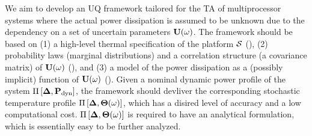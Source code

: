 We aim to develop an UQ framework tailored for the TA of multiprocessor systems where the actual power dissipation is assumed to be unknown due to the dependency on a set of uncertain parameters $\mathbf{U}(\omega)$. The framework should be based on (1) a high-level thermal specification of the platform $\mathcal{S}$ (), (2) probability laws (marginal distributions) and a correlation structure (a covariance matrix) of $\mathbf{U}(\omega)$ (), and (3) a model of the power dissipation as a (possibly implicit) function of $\mathbf{U}(\omega)$ (). Given a nominal dynamic power profile of the system $\prof{\mP_\dyn}$, the framework should devliver the corresponding stochastic temperature profile $\Pi\left[\boldsymbol{\Delta}, {\boldsymbol\Theta}(\omega)\right]$, which has a disired level of accuracy and a low computational cost. $\Pi\left[\boldsymbol{\Delta}, {\boldsymbol\Theta}(\omega)\right]$ is required to have an analytical formulation, which is essentially easy to be further analyzed.
